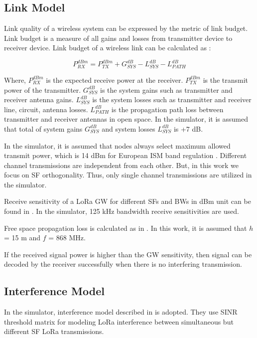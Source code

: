 \documentclass[conference]{IEEEtran}
\begin{document}
\subsection{Link Model}
\par Link quality of a wireless system can be expressed by the metric of link budget. Link budget is a measure of all gains and losses from transmitter device to receiver device. Link budget of a wireless link can be calculated as \cite{AN1200.22}:

\begin{equation} \label{eq:expected_rx_power}
P^{dBm}_{RX} = P^{dBm}_{TX} + G^{dB}_{SYS} - L^{dB}_{SYS} - L^{dB}_{PATH}
\end{equation}

\par Where, $P^{dBm}_{RX}$ is the expected receive power at the receiver. $P^{dBm}_{TX}$ is the transmit power of the transmitter. $G^{dB}_{SYS}$ is the system gains such as transmitter and receiver antenna gains. $L^{dB}_{SYS}$ is the system losses such as transmitter and receiver line, circuit, antenna losses. $L^{dB}_{PATH}$ is the propagation path loss between transmitter and receiver antennas in open space. In the simulator, it is assumed that total of system gains $G^{dB}_{SYS}$ and system losses $L^{dB}_{SYS}$ is +7 dB.

\par In the simulator, it is assumed that nodes always select maximum allowed transmit power, which is 14 dBm for European ISM band regulation \cite{lorawan.regional.parameters}. Different channel transmissions are independent from each other. But, in this work we focus on SF orthogonality. Thus, only single channel transmissions are utilized in the simulator.

\par Receive sensitivity of a LoRa GW for different SFs and BWs in dBm unit can be found in \cite{SX1276}. In the simulator, 125 kHz bandwidth receive sensitivities are used.

\par Free space propagation loss is calculated as in \cite{TR136.942}. In this work, it is assumed that $h$ = 15 m and $f$ = 868 MHz.

\par If the received signal power is higher than the GW sensitivity, then signal can be decoded by the receiver successfully when there is no interfering transmission.

\subsection{Interference Model}
\par In the simulator, interference model described in \cite{7996384} is adopted. They use SINR threshold matrix for modeling LoRa interference between simultaneous but different SF LoRa transmissions.
\end{document}
